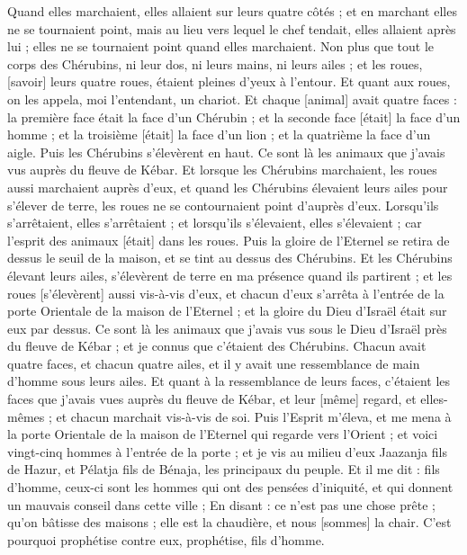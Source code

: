 \begin{multicols}{2}
Quand elles marchaient, elles allaient sur leurs quatre côtés ; et en marchant elles ne se tournaient point, mais au lieu vers lequel le chef tendait, elles allaient après lui ; elles ne se tournaient point quand elles marchaient.
Non plus que tout le corps des Chérubins, ni leur dos, ni leurs mains, ni leurs ailes ; et les roues, [savoir] leurs quatre roues, étaient pleines d'yeux à l'entour.
Et quant aux roues, on les appela, moi l'entendant, un chariot.
Et chaque [animal] avait quatre faces : la première face était la face d'un Chérubin ; et la seconde face [était] la face d'un homme ; et la troisième [était] la face d'un lion ; et la quatrième la face d'un aigle.
Puis les Chérubins s'élevèrent en haut. Ce sont là les animaux que j'avais vus auprès du fleuve de Kébar.
Et lorsque les Chérubins marchaient, les roues aussi marchaient auprès d'eux, et quand les Chérubins élevaient leurs ailes pour s'élever de terre, les roues ne se contournaient point d'auprès d'eux.
Lorsqu'ils s'arrêtaient, elles s'arrêtaient ; et lorsqu'ils s'élevaient, elles s'élevaient ; car l'esprit des animaux [était] dans les roues.
Puis la gloire de l'Eternel se retira de dessus le seuil de la maison, et se tint au dessus des Chérubins.
Et les Chérubins élevant leurs ailes, s'élevèrent de terre en ma présence quand ils partirent ; et les roues [s'élevèrent] aussi vis-à-vis d'eux, et chacun d'eux s'arrêta à l'entrée de la porte Orientale de la maison de l'Eternel ; et la gloire du Dieu d'Israël était sur eux par dessus.
Ce sont là les animaux que j'avais vus sous le Dieu d'Israël près du fleuve de Kébar ; et je connus que c'étaient des Chérubins.
Chacun avait quatre faces, et chacun quatre ailes, et il y avait une ressemblance de main d'homme sous leurs ailes.
Et quant à la ressemblance de leurs faces, c'étaient les faces que j'avais vues auprès du fleuve de Kébar, et leur [même] regard, et elles-mêmes ; et chacun marchait vis-à-vis de soi.
\VerseOne{}Puis l'Esprit m'éleva, et me mena à la porte Orientale de la maison de l'Eternel qui regarde vers l'Orient ; et voici vingt-cinq hommes à l'entrée de la porte ; et je vis au milieu d'eux Jaazanja fils de Hazur, et Pélatja fils de Bénaja, les principaux du peuple.
Et il me dit : fils d'homme, ceux-ci sont les hommes qui ont des pensées d'iniquité, et qui donnent un mauvais conseil dans cette ville ;
En disant : ce n'est pas une chose prête ; qu'on bâtisse des maisons ; elle est la chaudière, et nous [sommes] la chair.
C'est pourquoi prophétise contre eux, prophétise, fils d'homme.

\end{multicols}
